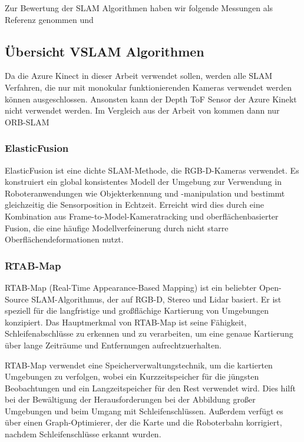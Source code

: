 Zur Bewertung der \ac{SLAM} Algorithmen haben wir folgende Messungen als Referenz genommen \cite{ragot:hal-04071273} und \cite{Merzlyakov2021}

\subsection{Übersicht \ac{VSLAM} Algorithmen}

Da die Azure Kinect in dieser Arbeit verwendet sollen, werden alle \ac{SLAM} Verfahren, die nur mit monokular funktionierenden Kameras verwendet werden können ausgeschlossen.
Ansonsten kann der Depth \ac{ToF} Sensor der Azure Kinekt nicht verwendet werden. Im Vergleich aus der Arbeit von \citeauthor{Merzlyakov2021} kommen dann nur ORB-SLAM

\subsubsection{ElasticFusion}


ElasticFusion ist eine dichte SLAM-Methode, die RGB-D-Kameras verwendet. Es konstruiert ein global konsistentes Modell der Umgebung zur Verwendung in Roboteranwendungen wie Objekterkennung und -manipulation und bestimmt gleichzeitig die Sensorposition in Echtzeit. Erreicht wird dies durch eine Kombination aus Frame-to-Model-Kameratracking und oberflächenbasierter Fusion, die eine häufige Modellverfeinerung durch nicht starre Oberflächendeformationen nutzt.


\subsubsection{RTAB-Map}

RTAB-Map (Real-Time Appearance-Based Mapping) ist ein beliebter Open-Source SLAM-Algorithmus, der auf RGB-D, Stereo und \ac{Lidar} basiert. Er ist speziell für die langfristige und großflächige Kartierung von Umgebungen konzipiert. Das Hauptmerkmal von RTAB-Map ist seine Fähigkeit, Schleifenabschlüsse zu erkennen und zu verarbeiten, um eine genaue Kartierung über lange Zeiträume und Entfernungen aufrechtzuerhalten.

RTAB-Map verwendet eine Speicherverwaltungstechnik, um die kartierten Umgebungen zu verfolgen, wobei ein Kurzzeitspeicher für die jüngsten Beobachtungen und ein Langzeitspeicher für den Rest verwendet wird. Dies hilft bei der Bewältigung der Herausforderungen bei der Abbildung großer Umgebungen und beim Umgang mit Schleifenschlüssen. Außerdem verfügt es über einen Graph-Optimierer, der die Karte und die Roboterbahn korrigiert, nachdem Schleifenschlüsse erkannt wurden.

